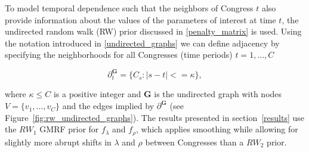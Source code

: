 To model temporal dependence such that the neighbors of Congress $t$ also provide information about the values of the parameters of interest at time $t$, the undirected random walk (RW) prior discussed in \ref{penalty_matrix} is used. Using the notation introduced in \ref{undirected_graphs} we can define adjacency by specifying the neighborhoods for all Congresses (time periods) $t = 1, \dots, C$

\begin{equation*}
\partial^\mathbf{G}_t = \{C_s : \left| s - t \right| <= \kappa \},
\end{equation*}

\noindent where $\kappa \leq C$ is a positive integer and $\mathbf{G}$ is the undirected graph with nodes $V = \{v_1, \dots, v_C\}$ and the edges implied by $\partial^\mathbf{G}$ (see Figure~\ref{fig:rw_undirected_graphs}). The results presented in section~\ref{results} use the $RW_1$ GMRF prior for $f_\lambda$ and $f_\rho$, which applies smoothing while allowing for slightly more abrupt shifts in $\lambda$ and $\rho$ between Congresses than a $RW_2$ prior. 


